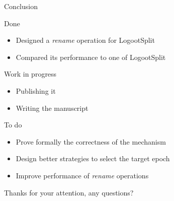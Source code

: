\documentclass[10pt]{beamer}
\begin{document}
\begin{frame}{Conclusion}
  \begin{block}{Done}
    \vspace{-1mm}
    \begin{itemize}
      \item Designed a \emph{rename} operation for LogootSplit
      \item Compared its performance to one of LogootSplit
    \end{itemize}
  \end{block}

  \pause

  \begin{block}{Work in progress}
    \vspace{-1mm}
    \begin{itemize}
      \item Publishing it
      \item Writing the manuscript
    \end{itemize}
  \end{block}

  \pause

  \begin{block}{To do}
    \vspace{-1mm}
    \begin{itemize}
      \item Prove formally the correctness of the mechanism
      \item Design better strategies to select the target epoch
      \item Improve performance of \emph{rename} operations
    \end{itemize}
  \end{block}
\end{frame}

\begin{frame}[standout]
  Thanks for your attention, any questions?
  \vspace{3em}
  \begin{center}
    \ccby
  \end{center}
\end{frame}
\end{document}
